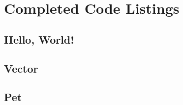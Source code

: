\section{Completed Code Listings}

	\subsection{Hello, World!}

		
		
		
		
		
	
	\newpage
	\subsection{Vector}
		
	
	\newpage
	\subsection{Pet}
	
		
		
		
	
